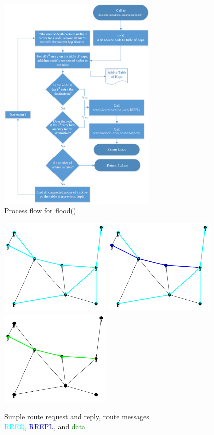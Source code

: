 \documentclass[conference]{IEEEtran}
\begin{document}
\begin{figure}[ht]
	\centering
	\includegraphics[width=3in]{flood.png}
	\caption{Process flow for flood()}
	\label{fig:flood}
\end{figure}

\begin{figure}[ht]
	\centering
	\includegraphics[width=2.1in]{Ex_1_request.png}
	\includegraphics[width=2.1in]{Ex_1_reply.png}
	\includegraphics[width=2.1in]{Ex_1_data.png}
	\caption{Simple route request and reply, route messages \\
			\textcolor{cyan}{RREQ}, \textcolor{blue}{RREPL}, and \textcolor{green}{data} }
	\label{fig:ex_1}
\end{figure}
\end{document}
